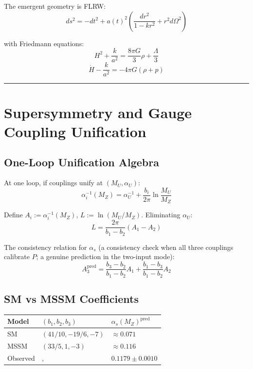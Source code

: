 The emergent geometry is FLRW: \[ds^2 = -dt^2 + a(t)^2 \left(\frac{dr^2}{1-kr^2} + r^2 d\Omega^2\right)\]

with Friedmann equations: \[H^2 + \frac{k}{a^2} = \frac{8\pi G}{3}\rho + \frac{\Lambda}{3}\] \[\dot{H} - \frac{k}{a^2} = -4\pi G(\rho + p)\]

\begin{center}\rule{0.5\linewidth}{0.5pt}\end{center}

\section{Supersymmetry and Gauge Coupling Unification}\label{5-supersymmetry-and-gauge-coupling-unification}

\subsection{One-Loop Unification Algebra}\label{51-one-loop-unification-algebra}

At one loop, if couplings unify at \((M_U, \alpha_U)\): \[\alpha_i^{-1}(M_Z) = \alpha_U^{-1} + \frac{b_i}{2\pi}\ln\frac{M_U}{M_Z}\]

Define \(A_i := \alpha_i^{-1}(M_Z)\), \(L := \ln(M_U/M_Z)\). Eliminating \(\alpha_U\): \[L = \frac{2\pi}{b_1 - b_2}(A_1 - A_2)\]

The consistency relation for \(\alpha_s\) (a consistency check when all three couplings calibrate $P$; a genuine prediction in the two-input mode): \[A_3^{\text{pred}} = \frac{b_3 - b_2}{b_1 - b_2}A_1 + \frac{b_1 - b_3}{b_1 - b_2}A_2\]

\subsection{SM vs MSSM Coefficients}\label{52-sm-vs-mssm-coefficients}

{\def\LTcaptype{none} %
\begin{longtable}[]{@{}>{\RaggedRight\arraybackslash}p{}>{\RaggedRight\arraybackslash}p{}>{\RaggedRight\arraybackslash}p{}@{}}
\toprule\noalign{}
Model & \((b_1, b_2, b_3)\) & \(\alpha_s(M_Z)^{\text{pred}}\) \\
\midrule\noalign{}
\endhead
\bottomrule\noalign{}
\endlastfoot
SM & \((41/10, -19/6, -7)\) & \(\approx 0.071\) \\
MSSM & \((33/5, 1, -3)\) & \(\approx 0.116\) \\
Observed &, & \(0.1179 \pm 0.0010\) \\
\end{longtable}
}

